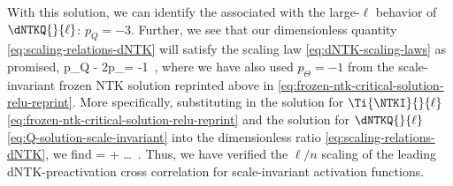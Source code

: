 With this solution, we can identify the  associated with the large-$\ell$ behavior of $\dNTKQ{}{\ell}$: $p_Q = -3$. Further, we see that our dimensionless quantity \eqref{eq:scaling-relations-dNTK} will satisfy the scaling law \eqref{eq:dNTK-scaling-laws} as promised,
\be
p_Q - 2p_\Theta = -1\, ,
\ee
where we have also used $p_\Theta=-1$ from the scale-invariant frozen NTK solution reprinted above in \eqref{eq:frozen-ntk-critical-solution-relu-reprint}. More specifically, substituting in the solution for $\Ti{\NTKI}{}{\ell}$ \eqref{eq:frozen-ntk-critical-solution-relu-reprint} and the solution for $\dNTKQ{}{\ell}$ \eqref{eq:Q-solution-scale-invariant} into the dimensionless ratio \eqref{eq:scaling-relations-dNTK}, we find
\be
{} =  + \dots \, .
\ee
Thus, we have verified the $\ell/n$ scaling of the leading dNTK-preactivation cross correlation for scale-invariant activation functions.






